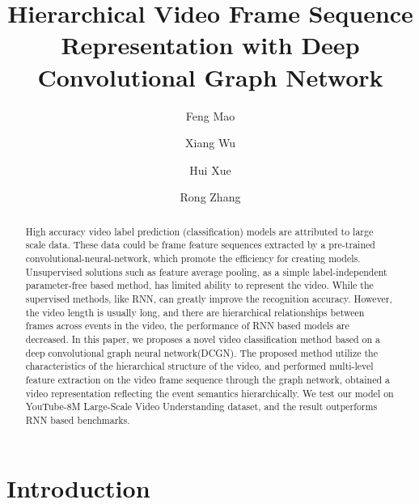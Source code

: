 \documentclass[runningheads]{llncs}
\begin{document}
\title{Hierarchical Video Frame Sequence Representation with Deep Convolutional Graph Network} 




\author{Feng Mao  \and
Xiang Wu   \and
Hui Xue \and
Rong Zhang}


\maketitle              \begin{abstract}
High accuracy video label prediction (classification) models are attributed to large scale data. These data could be frame feature sequences extracted by a pre-trained convolutional-neural-network, which promote the efficiency for creating models. Unsupervised solutions such as feature average pooling, as a simple label-independent parameter-free based method, has limited ability to represent the video. While the supervised methods, like RNN, can greatly improve the recognition accuracy. However, the video length is usually long, and there are hierarchical relationships between frames across events in the video, the performance of RNN based models are decreased. In this paper, we proposes a novel video classification method based on a deep convolutional graph neural network(DCGN). The proposed method utilize the characteristics of the hierarchical structure of the video, and performed multi-level feature extraction on the video frame sequence through the graph network, obtained a video representation reflecting the event semantics hierarchically. We test our model on YouTube-8M Large-Scale Video Understanding dataset, and the result outperforms RNN based benchmarks.

\end{abstract}
\section{Introduction}
\end{document}
